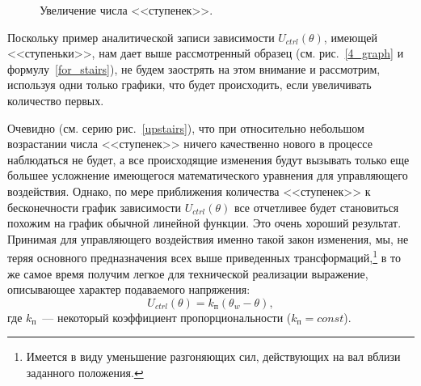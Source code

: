 \documentclass[12pt,a4paper,openany]{extarticle}
\begin{document}
\begin{figure}[h]
	\noindent{}
	\caption{Увеличение числа <<ступенек>>.}
	\label{6_graph}
\end{figure}

Поскольку пример аналитической записи зависимости $U_{ctrl}(\theta)$, имеющей <<ступеньки>>, нам дает выше рассмотренный образец (см. рис.~\ref{4_graph} и формулу~\eqref{for_stairs}), не будем заострять на этом внимание и рассмотрим, используя одни только графики, что будет происходить, если увеличивать количество первых.

Очевидно (см. серию рис.~\ref{upstairs}), что при относительно небольшом возрастании числа <<ступенек>> ничего качественно нового в процессе наблюдаться не будет, а все происходящие изменения будут вызывать только еще большее усложнение имеющегося математического уравнения для управляющего воздействия.
Однако, по мере приближения количества <<ступенек>> к бесконечности график зависимости $U_{ctrl}(\theta)$ все отчетливее будет становиться похожим на график обычной линейной функции.
Это очень хороший результат.
Принимая для управляющего воздействия именно такой закон изменения, мы, не теряя основного предназначения всех выше приведенных трансформаций\lefteqn,\footnote{Имеется в виду уменьшение разгоняющих сил, действующих на вал вблизи заданного положения.} в то же самое время получим легкое для технической реализации выражение, описывающее характер подаваемого напряжения:
\begin{equation}\label{p-controller}
	U_{ctrl}(\theta) = k_\textit{п}(\theta_w - \theta),
\end{equation}
где $k_\textit{п}$~--- некоторый коэффициент пропорциональности ($k_\textit{п} = const$).
\end{document}
